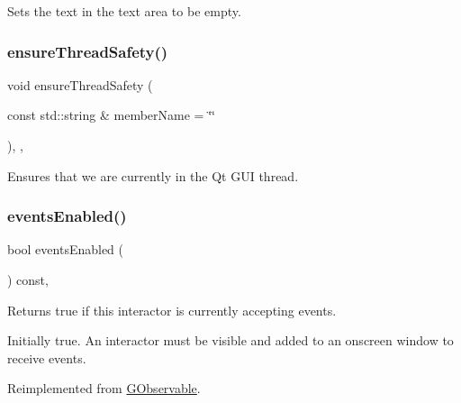 Sets the text in the text area to be empty. 

\mbox{\label{classGObservable_a284f31528c0520f8e545c03ac9eeac74}} 
\subsubsection{\texorpdfstring{ensure\+Thread\+Safety()}{ensureThreadSafety()}}
{\footnotesize\ttfamily void ensure\+Thread\+Safety (\begin{DoxyParamCaption}\item[{const std\+::string \&}]{member\+Name = {\ttfamily \char`\"{}\char`\"{}} }\end{DoxyParamCaption})\hspace{0.3cm}{\ttfamily [protected]}, {\ttfamily [virtual]}, {\ttfamily [inherited]}}



Ensures that we are currently in the Qt G\+UI thread. 

\mbox{\label{classGInteractor_ac05ba5b92e2e5146d416fe7f842a0969}} 
\subsubsection{\texorpdfstring{events\+Enabled()}{eventsEnabled()}}
{\footnotesize\ttfamily bool events\+Enabled (\begin{DoxyParamCaption}{ }\end{DoxyParamCaption}) const\hspace{0.3cm}{\ttfamily [virtual]}, {\ttfamily [inherited]}}



Returns true if this interactor is currently accepting events. 

Initially true. An interactor must be visible and added to an onscreen window to receive events. 

Reimplemented from \mbox{\hyperlink{classGObservable_a8ebb3da91032e7f4c34485dabc518b8a}{G\+Observable}}.

\mbox{\label{classGObservable_a63e5e5a6227c59c928493b11aceb0f67}} 
